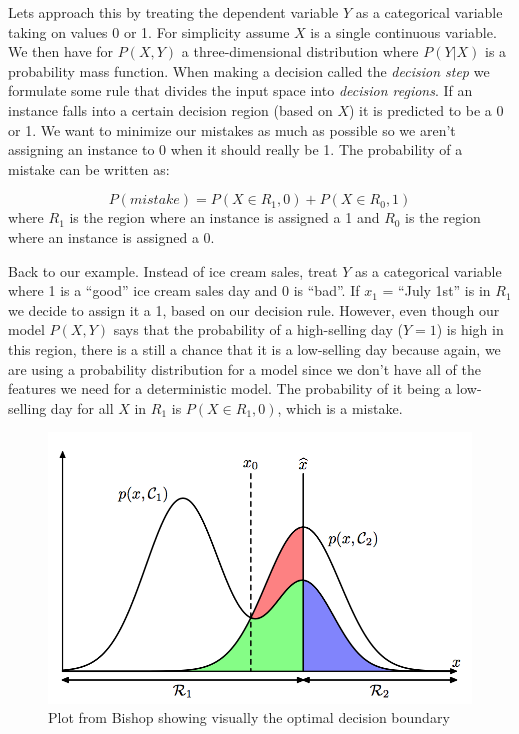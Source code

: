 \documentclass[paper=a4, fontsize=11pt]{scrartcl} %
\numberwithin{equation}{section} %
\numberwithin{figure}{section} %
\numberwithin{table}{section} %
\begin{document}
Lets approach this by treating the dependent variable $Y$ as a categorical variable taking on values 0 or 1. For simplicity assume $X$ is a single continuous variable. We then have for $P(X,Y)$ a three-dimensional distribution where $P(Y|X)$ is a probability mass function. When making a decision called the \emph{decision step} we formulate some rule that divides the input space into \emph{decision regions}. If an instance falls into a certain decision region (based on $X$) it is predicted to be a 0 or 1. We want to minimize our mistakes as much as possible so we aren't assigning an instance to 0 when it should really be 1. The probability of a mistake can be written as:

\begin{equation}
P(mistake) = P(X\in R_1, 0) + P(X\in R_0, 1)
\end{equation}
where $R_1$ is the region where an instance is assigned a 1 and $R_0$ is the region where an instance is assigned a 0.

Back to our example. Instead of ice cream sales, treat $Y$ as a categorical variable where 1 is a ``good'' ice cream sales day and 0 is ``bad''.  If $x_1$ = ``July 1st'' is in $R_1$ we decide to assign it a 1, based on our decision rule. However, even though our model $P(X,Y)$ says that the probability of a high-selling day ($Y=1$) is high in this region, there is a still a chance that it is a low-selling day because again, we are using a probability distribution for a model since we don't have all of the features we need for a deterministic model. The probability of it being a low-selling day for all $X$ in $R_1$ is $P(X\in R_1, 0)$, which is a mistake.

 \begin{figure}[t] \label{fig:bishop_optimal_distributions}
\caption{Plot from Bishop showing visually the optimal decision boundary}
\centering
 \includegraphics[scale=.7]{bishop_optimal_distributions.png}
 \end{figure}
 
\end{document}
